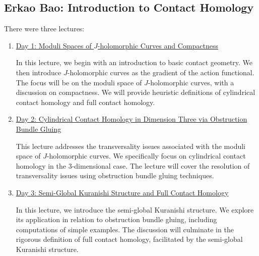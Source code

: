 % 
%
%

\begin{partbacktext}
\part{Erkao Bao: Introduction to Contact Homology}

There were three lectures:\\

\begin{enumerate}
    \item \href{#b1}{Day 1: Moduli Spaces of $J$-holomorphic Curves and Compactness}

    In this lecture, we begin with an introduction to basic contact geometry. We then introduce $J$-holomorphic curves as the gradient of the action functional. The focus will be on the moduli space of $J$-holomorphic curves, with a discussion on compactness. We will provide heuristic definitions of cylindrical contact homology and full contact homology.
    
    \item \href{#b2}{Day 2: Cylindrical Contact Homology in Dimension Three via Obstruction Bundle Gluing}

    This lecture addresses the transversality issues associated with the moduli space of $J$-holomorphic curves. We specifically focus on cylindrical contact homology in the 3-dimensional case. The lecture will cover the resolution of transversality issues using obstruction bundle gluing techniques.

    \item \href{#b3}{Day 3: Semi-Global Kuranishi Structure and Full Contact Homology}

    In this lecture, we introduce the semi-global Kuranishi structure. We explore its application in relation to obstruction bundle gluing, including computations of simple examples. The discussion will culminate in the rigorous definition of full contact homology, facilitated by the semi-global Kuranishi structure.

\end{enumerate}

\end{partbacktext}